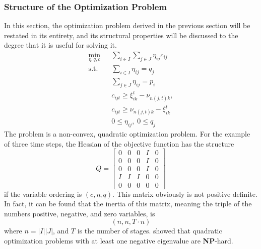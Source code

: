 \subsubsection{Structure of the Optimization Problem}
In this section, the optimization problem derived in the previous section will be restated in its entirety, and its structural properties will be discussed to the degree that it is useful for solving it.
\begin{subequations}
\begin{eqnarray}
  \label{eq:full-nlp-restated-objecive}
  \min_{\eta, q, c}&&  \sum_{i\in I}\sum_{j\in J} \eta_{ij} c_{ij}\\
  \label{eq:full-nlp-restated-q}
  \mathrm{s.t.}&&\sum_{i\in I}\eta_{ij} = q_j \\
  \label{eq:full-nlp-restated-p}
  &&\sum_{j\in J}\eta_{ij} = p_i\\
  \label{eq:full-nlp-restated-ineq1}
  &&c_{ijt} \geq \xi_{ik}^t - \nu_{n(j,t)k},\\
  \label{eq:full-nlp-restated-ineq2}
  &&c_{ijt} \geq \nu_{n(j,t)k} - \xi_{ik}^t\\
  &&0 \leq \eta_{ij},\; 0\leq q_j
\end{eqnarray}
\end{subequations}
The problem is a non-convex, quadratic optimization problem. For the example of three time steps, the Hessian of the objective function has the structure
\begin{equation}
  \label{eq:structure-of-quadratic-hessian}
  Q = \left[\begin{array}{ccccc}
      0&0&0&I&0\\0&0&0&I&0\\0&0&0&I&0\\I&I&I&0&0\\0&0&0&0&0
    \end{array}\right]
\end{equation}
if the variable ordering is $(c,\eta, q)$. This matrix obviously is not positive definite. In fact, it can be found that the inertia of this matrix, meaning the triple of the numbers positive, negative, and zero variables, is
\begin{equation}
  \label{eq:inertia-of-hessian}
  \left(n, n, T\cdot n\right)
\end{equation}
where $n=|I||J|$, and $T$ is the number of stages.
 showed that quadratic optimization problems with at least one negative eigenvalue are \textbf{NP}-hard.
